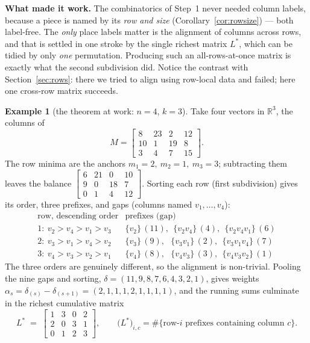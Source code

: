 \documentclass[11pt,a4paper]{article}
\theoremstyle{definition}
\newtheorem{example}[definition]{Example}
\theoremstyle{plain}
\newcommand{\R}{\mathbb{R}}
\begin{document}
\begin{tcolorbox}[ideabox]
\textbf{What made it work.} The combinatorics of Step~1 never needed column
labels, because a piece is named by its \emph{row and size}
(Corollary~\ref{cor:rowsize}) --- both label-free. The \emph{only} place labels
matter is the alignment of columns across rows, and that is settled in one
stroke by the single richest matrix $L^\ast$, which can be tidied by only
\emph{one} permutation. Producing such an all-rows-at-once matrix is exactly what
the second subdivision did. Notice the contrast with
Section~\ref{sec:rows}: there we tried to align using row-local data and failed;
here one cross-row matrix succeeds.
\end{tcolorbox}

\begin{example}[the theorem at work: $n=4$, $k=3$]\label{ex:recon}
Take four vectors in $\R^3$, the columns of
\[
   M=\begin{bmatrix} 8 & 23 & 2 & 12\\[1pt] 10 & 1 & 19 & 8\\[1pt] 3 & 4 & 7 & 15\end{bmatrix}.
\]
The row minima are the anchors $m_1=2,\ m_2=1,\ m_3=3$; subtracting them leaves the
balance $\left[\begin{smallmatrix}6&21&0&10\\9&0&18&7\\0&1&4&12\end{smallmatrix}\right]$.
Sorting each row (first subdivision) gives its order, three prefixes, and gaps
(columns named $v_1,\dots,v_4$):
\[
\renewcommand{\arraystretch}{1.2}
\begin{array}{c|l}
\text{row, descending order} & \text{prefixes (gap)}\\\hline
1:\ v_2{>}v_4{>}v_1{>}v_3 & \{v_2\}\,(11),\ \ \{v_2v_4\}\,(4),\ \ \{v_2v_4v_1\}\,(6)\\
2:\ v_3{>}v_1{>}v_4{>}v_2 & \{v_3\}\,(9),\ \ \ \{v_3v_1\}\,(2),\ \ \{v_3v_1v_4\}\,(7)\\
3:\ v_4{>}v_3{>}v_2{>}v_1 & \{v_4\}\,(8),\ \ \ \{v_4v_3\}\,(3),\ \ \{v_4v_3v_2\}\,(1)
\end{array}
\]
The three orders are genuinely different, so the alignment is non-trivial.
Pooling the nine gaps and sorting, $\delta=(11,9,8,7,6,4,3,2,1)$, gives weights
$\alpha_s=\delta_{(s)}-\delta_{(s+1)}=(2,1,1,1,2,1,1,1,1)$, and the running sums
culminate in the richest cumulative matrix
\[
   L^\ast \;=\; \begin{bmatrix}1&3&0&2\\[1pt]2&0&3&1\\[1pt]0&1&2&3\end{bmatrix},
   \qquad \bigl(L^\ast\bigr)_{i,c}=\#\{\text{row-}i\text{ prefixes containing column }c\}.
\]


\end{example}
\end{document}
